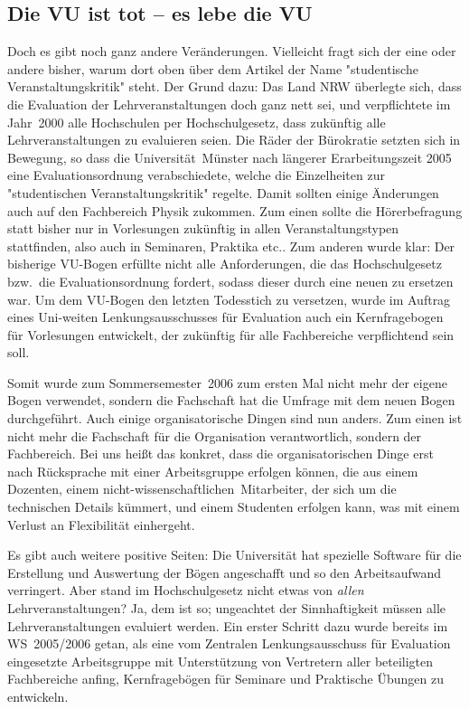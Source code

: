 \begin{multicols}{2}
\subsection{Die VU ist tot -- es lebe die VU}
Doch es gibt noch ganz andere Veränderungen.
Vielleicht fragt sich der eine oder andere bisher, warum dort oben über dem Artikel der Name "studentische Veranstaltungskritik" steht.
Der Grund dazu: Das Land NRW überlegte sich, dass die Evaluation der Lehrveranstaltungen doch ganz nett sei, und verpflichtete im Jahr~2000 alle Hochschulen per Hochschulgesetz, dass zukünftig alle Lehrveranstaltungen zu evaluieren seien.
Die Räder der Bürokratie setzten sich in Bewegung, so dass die Universität~Münster nach längerer Erarbeitungszeit 2005 eine Evaluationsordnung verabschiedete, welche die Einzelheiten zur "studentischen Veranstaltungskritik" regelte.
Damit sollten einige Änderungen auch auf den Fachbereich Physik zukommen.
Zum einen sollte die Hörerbefragung statt bisher nur in Vorlesungen zukünftig in allen Veranstaltungstypen stattfinden, also auch in Seminaren, Praktika etc..
Zum anderen wurde klar: Der bisherige VU-Bogen erfüllte nicht alle Anforderungen, die das Hochschulgesetz bzw.\ die Evaluationsordnung fordert, sodass dieser durch eine neuen zu ersetzen war.
Um dem VU-Bogen den letzten Todesstich zu versetzen, wurde im Auftrag eines Uni-weiten Lenkungsausschusses für Evaluation auch ein Kernfragebogen für Vorlesungen entwickelt, der zukünftig für alle Fachbereiche verpflichtend sein soll.

\vspace{-2ex}

Somit wurde zum Sommersemester~2006 zum ersten Mal nicht mehr der eigene Bogen verwendet, sondern die Fachschaft hat die Umfrage mit dem neuen Bogen durchgeführt.
Auch einige organisatorische Dingen sind nun anders.
Zum einen ist nicht mehr die Fachschaft für die Organisation verantwortlich, sondern der Fachbereich.
Bei uns heißt das konkret, dass die organisatorischen Dinge erst nach Rücksprache mit einer Arbeitsgruppe erfolgen können, die aus einem Dozenten, einem nicht-wissenschaftlichen~Mitarbeiter, der sich um die technischen Details kümmert, und einem Studenten erfolgen kann, was mit einem Verlust an Flexibilität einhergeht.

Es gibt auch weitere positive Seiten: Die Universität hat spezielle Software für die Erstellung und Auswertung der Bögen angeschafft und so den Arbeitsaufwand verringert. 
Aber stand im Hochschulgesetz nicht etwas von \emph{allen} Lehrveranstaltungen? Ja, dem ist so; ungeachtet der Sinnhaftigkeit müssen alle Lehrveranstaltungen evaluiert werden.
Ein erster Schritt dazu wurde bereits im WS~2005/2006 getan, als eine vom Zentralen Lenkungsausschuss für Evaluation eingesetzte Arbeitsgruppe mit Unterstützung von Vertretern aller beteiligten Fachbereiche anfing, Kernfragebögen für Seminare und Praktische Übungen zu entwickeln.


\end{multicols}
